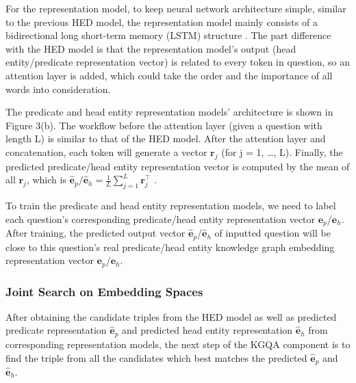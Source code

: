 \documentclass[11pt]{article}
\begin{document}
For the representation model, to keep neural network architecture simple, similar to the previous HED model, the representation model mainly consists of a bidirectional long short-term memory (LSTM) structure \cite{c20}. The part difference with the HED model is that the representation model's output (head entity/predicate representation vector) is related to every token in question, so an attention layer is added, which could take the order and the importance of all words into consideration.

The predicate and head entity representation models' architecture is shown in Figure 3(b). The workflow before the attention layer (given a question with length L) is similar to that of the HED model. After the attention layer and concatenation, each token will generate a vector $\mathbf{r}_j$ (for j = 1, …, L). Finally, the predicted predicate/head entity representation vector is computed by the mean of all $\mathbf{r}_j$, which is $\hat{\mathbf{e}}_{p}/\hat{\mathbf{e}}_{h}=\frac{1}{L} \sum_{j=1}^L \mathbf{r}_j^{\top}$ .

To train the predicate and head entity representation models, we need to label each question's corresponding predicate/head entity representation vector ${\mathbf{e}}_p$/$\mathbf{e}_h$. After training, the predicted output vector $\hat{\mathbf{e}}_p$/$\hat{\mathbf{e}}_h$ of inputted question will be close to this question's real predicate/head entity knowledge graph embedding representation vector ${\mathbf{e}}_p$/$\mathbf{e}_h$.





\subsubsection{Joint Search on Embedding Spaces}\label{sec:Joint Search on Embedding Spaces}
After obtaining the candidate triples from the HED model as well as predicted predicate representation $\hat{\mathbf{e}}_p$ and predicted head entity representation $\hat{\mathbf{e}}_h$ from corresponding representation models, the next step of the KGQA component is to find the triple from all the candidates which best matches the predicted $\hat{\mathbf{e}}_p$ and $\hat{\mathbf{e}}_h$.
\end{document}
